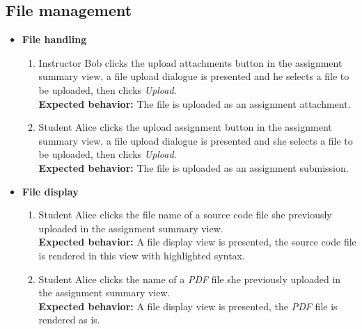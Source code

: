 \subsection{File management}
\begin{itemize}
    \item {\bf File handling} \begin{enumerate}
        \item Instructor Bob clicks the upload attachments button in the
            assignment summary view, a file upload dialogue is presented
            and he selects a file to be uploaded, then clicks \emph{Upload}. \\
        {\bf Expected behavior:} The file is uploaded as an assignment
            attachment.

        \item Student Alice clicks the upload assignment button in the
            assignment summary view, a file upload dialogue is presented
            and she selects a file to be uploaded, then clicks \emph{Upload}. \\
        {\bf Expected behavior:} The file is uploaded as an assignment
            submission.
    \end{enumerate}

    \item {\bf File display} \begin{enumerate}
        \item Student Alice clicks the file name of a source code file she
            previously uploaded in the assignment summary view. \\
        {\bf Expected behavior:} A file display view is presented, the source
            code file is rendered in this view with highlighted syntax.

        \item Student Alice clicks the name of a \emph{PDF} file she previously
            uploaded in the assignment summary view. \\
        {\bf Expected behavior:} A file display view is presented, the
            \emph{PDF} file is rendered as is.
    \end{enumerate}
\end{itemize}


